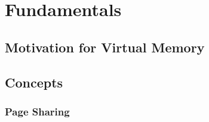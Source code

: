 \chapter{Fundamentals} %

\label{Chapter2} %




\section{Motivation for Virtual Memory}

\section{Concepts}
\subsection{Page Sharing}




